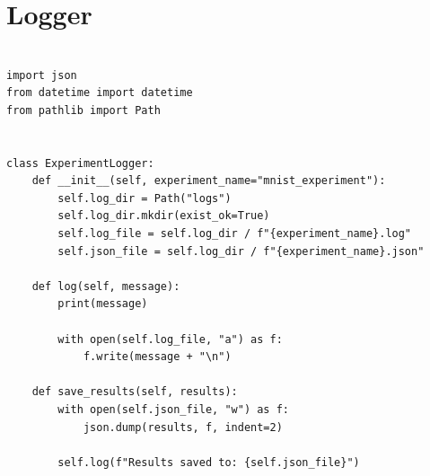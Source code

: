 \chapter{Logger}
\label{appendix:logger}

\begin{verbatim}

import json
from datetime import datetime
from pathlib import Path


class ExperimentLogger:
    def __init__(self, experiment_name="mnist_experiment"):
        self.log_dir = Path("logs")
        self.log_dir.mkdir(exist_ok=True)
        self.log_file = self.log_dir / f"{experiment_name}.log"
        self.json_file = self.log_dir / f"{experiment_name}.json"

    def log(self, message):
        print(message)

        with open(self.log_file, "a") as f:
            f.write(message + "\n")

    def save_results(self, results):
        with open(self.json_file, "w") as f:
            json.dump(results, f, indent=2)

        self.log(f"Results saved to: {self.json_file}")

\end{verbatim}
